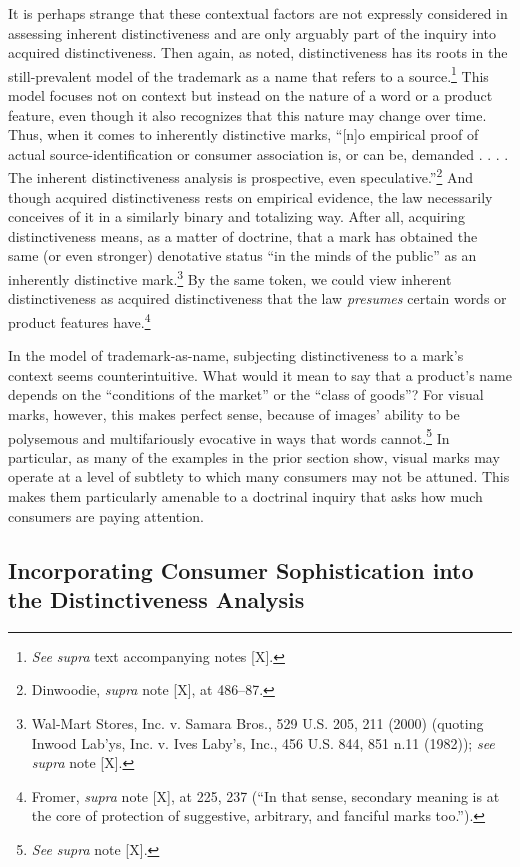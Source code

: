 \documentclass[letterpaper, 11pt, oneside]{article}
\begin{document}
It is perhaps strange that these contextual factors are not expressly considered in assessing inherent distinctiveness and are only arguably part of the inquiry into acquired distinctiveness. Then again, as noted, distinctiveness has its roots in the still-prevalent model of the trademark as a name that refers to a source.\footnote{\textit{See supra} text accompanying notes [X].} This model focuses not on context but instead on the nature of a word or a product feature, even though it also recognizes that this nature may change over time. Thus, when it comes to inherently distinctive marks, ``[n]o empirical proof of actual source-identification or consumer association is, or can be, demanded . . . . The inherent distinctiveness analysis is prospective, even speculative.''\footnote{Dinwoodie, \textit{supra} note [X], at 486–87.} And though acquired distinctiveness rests on empirical evidence, the law necessarily conceives of it in a similarly binary and totalizing way. After all, acquiring distinctiveness means, as a matter of doctrine, that a mark has obtained the same (or even stronger) denotative status ``in the minds of the public'' as an inherently distinctive mark.\footnote{Wal-Mart Stores, Inc. v. Samara Bros., 529 U.S. 205, 211 (2000) (quoting Inwood Lab'ys, Inc. v. Ives Laby's, Inc., 456 U.S. 844, 851 n.11 (1982)); \textit{see supra} note [X].} By the same token, we could view inherent distinctiveness as acquired distinctiveness that the law \textit{presumes} certain words or product features have.\footnote{Fromer, \textit{supra} note [X], at 225, 237 (``In that sense, secondary meaning is at the core of protection of suggestive, arbitrary, and fanciful marks too.'').}

In the model of trademark-as-name, subjecting distinctiveness to a mark's context seems counterintuitive. What would it mean to say that a product's name depends on the ``conditions of the market'' or the ``class of goods''? For visual marks, however, this makes perfect sense, because of images' ability to be polysemous and multifariously evocative in ways that words cannot.\footnote{\textit{See supra} note [X].} In particular, as many of the examples in the prior section show, visual marks may operate at a level of subtlety to which many consumers may not be attuned. This makes them particularly amenable to a doctrinal inquiry that asks how much consumers are paying attention.

\subsection{Incorporating Consumer Sophistication into the Distinctiveness Analysis}\label{subsec:3B}
\end{document}
